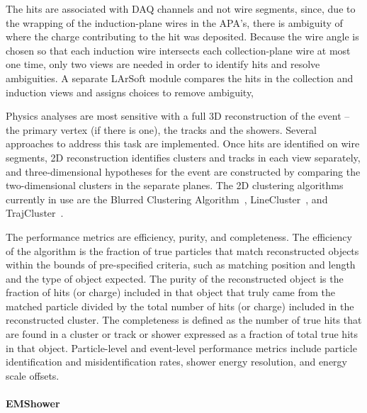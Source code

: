 The hits are associated with DAQ channels and
not wire segments, since, due to the wrapping of the induction-plane
wires in the \pdsp APA's, there is ambiguity of where the
charge contributing to the hit was deposited.  Because the wire angle
is chosen so that each induction wire intersects each collection-plane
wire at most one time, only two views are needed in order to identify
hits and resolve ambiguities.  A separate LArSoft module compares the
hits in the collection and induction views and assigns choices to
remove ambiguity, 

Physics analyses are most sensitive with a full 3D reconstruction of the
event -- the primary vertex (if there is one), the tracks and the showers.
Several approaches to address this task are implemented. Once hits are identified on wire
segments, 2D reconstruction identifies clusters and tracks
in each view separately, and three-dimensional hypotheses for
the event are constructed by comparing the two-dimensional clusters
in the separate planes.  The 2D clustering algorithms currently in
use are the Blurred Clustering Algorithm~\cite{blurredclustering},
LineCluster~\cite{linecluster}, and TrajCluster~\cite{trajcluster}.  

The performance metrics are efficiency, purity, and completeness.  The
efficiency of the algorithm is the fraction of true particles that
match reconstructed objects within the bounds of pre-specified
criteria, such as matching position and length and the type of object
expected.  The purity of the reconstructed object is the fraction of
hits (or charge) included in that object that truly came from the
matched particle divided by the total number of hits (or charge)
included in the reconstructed cluster.  The completeness is defined as
the number of true hits that are found in a cluster or track or shower
expressed as a fraction of total true hits in that object.  
Particle-level and event-level performance metrics include particle identification
and misidentification rates, shower energy resolution, and energy scale offsets.

\paragraph{EMShower}

